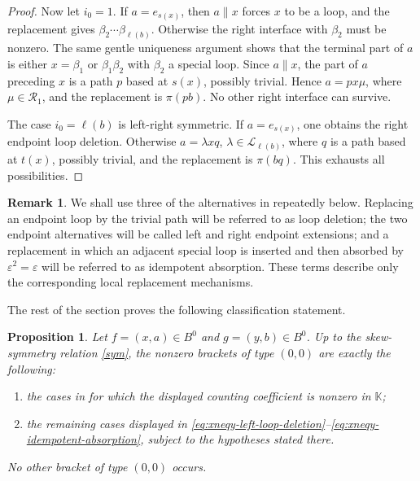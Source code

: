 \documentclass[11pt,a4paper,reqno]{amsart}
\newcommand{\mK}{\mathbb K}
\newcommand{\mL}{\mathcal L}
\newcommand{\mR}{\mathcal R}
\newcommand{\para}[2]{(#1,#2)}
\newcommand{\bet}{\beta_{\ell(b)}}
\theoremstyle{plain}
\newtheorem{proposition}[proposition]{Proposition}
\theoremstyle{definition}
\newtheorem{remark}[remark]{Remark}
\numberwithin{equation}{section}
\begin{document}
\begin{proof}
		Now let $i_0=1$.  If $a=e_{s(x)}$, then $a\parallel x$ forces $x$ to be
		a loop, and the replacement gives $\beta_2\cdots\bet$.  Otherwise the
		right interface with $\beta_2$ must be nonzero.  The same gentle
		uniqueness argument shows that the terminal part of $a$ is either
		$x=\beta_1$ or $\beta_1\beta_2$ with $\beta_2$ a special loop.  Since
		$a\parallel x$, the part of $a$ preceding $x$ is a path $p$ based at
		$s(x)$, possibly trivial.  Hence
		$a=px\mu$, where $\mu\in\mR_1$,
		and the replacement is $\pi(pb)$.  No other right interface can survive.
		
		The case $i_0=\ell(b)$ is left-right symmetric.  If $a=e_{s(x)}$, one
		obtains the right endpoint loop deletion.  Otherwise
		$a=\lambda xq$, $\lambda\in\mL_{\ell(b)}$, where $q$ is a path based at $t(x)$, possibly trivial, and the replacement
		is $\pi(bq)$.  This exhausts all possibilities.
	\end{proof}
	
	\begin{remark}
		We shall use three of the alternatives in 
		repeatedly below.  Replacing an endpoint loop by the trivial path will be
		referred to as loop deletion; the two endpoint alternatives will be called
		left and right endpoint extensions; and a replacement in which an adjacent
		special loop is inserted and then absorbed by $\varepsilon^2=\varepsilon$
		will be referred to as idempotent absorption.  These terms describe only the
		corresponding local replacement mechanisms.
	\end{remark}
	
	The rest of the section proves the following classification statement.
	
	\begin{proposition}\label{prop:degree-zero-classification}
		Let $f=\para{x}{a}\in B^0$ and $g=\para{y}{b}\in B^0$.  Up to the
		skew-symmetry relation \eqref{sym}, the nonzero brackets of type $(0,0)$ are
		exactly the following:
		\begin{enumerate}
			\item the cases in  for which the displayed
			counting coefficient is nonzero in $\mK$;
			\item the remaining cases displayed in
			\eqref{eq:xneqy-left-loop-deletion}--\eqref{eq:xneqy-idempotent-absorption},
			subject to the hypotheses stated there.
		\end{enumerate}
		No other bracket of type $(0,0)$ occurs.
	\end{proposition}
	
\end{document}
